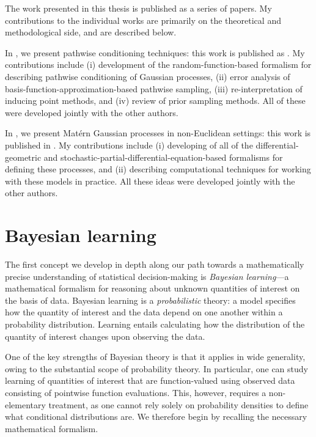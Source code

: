\documentclass[11pt]{book}
\begin{document}
The work presented in this thesis is published as a series of papers.
My contributions to the individual works are primarily on the theoretical and methodological side, and are described below.

In , we present pathwise conditioning techniques: this work is published as \textcite{wilson20,wilson21}.
My contributions include (i) development of the random-function-based formalism for describing pathwise conditioning of Gaussian processes, (ii) error analysis of basis-function-approximation-based pathwise sampling, (iii) re-interpretation of inducing point methods, and (iv) review of prior sampling methods.
All of these were developed jointly with the other authors. 

In , we present Matérn Gaussian processes in non-Euclidean settings: this work is published in \textcite{borovitskiy20,borovitskiy21,jacquier21,hutchinson21}.
My contributions include (i) developing of all of the differential-geometric and stochastic-partial-differential-equation-based formalisms for defining these processes, and (ii) describing computational techniques for working with these models in practice.
All these ideas were developed jointly with the other authors.


\section{Bayesian learning}

The first concept we develop in depth along our path towards a mathematically precise understanding of statistical decision-making is \emph{Bayesian learning}---a mathematical formalism for reasoning about unknown quantities of interest on the basis of data.
Bayesian learning is a \emph{probabilistic} theory: a model specifies how the quantity of interest and the data depend on one another within a probability distribution.
Learning entails calculating how the distribution of the quantity of interest changes upon observing the data.

One of the key strengths of Bayesian theory is that it applies in wide generality, owing to the substantial scope of probability theory. 
In particular, one can study learning of quantities of interest that are function-valued using observed data consisting of pointwise function evaluations.
This, however, requires a non-elementary treatment, as one cannot rely solely on probability densities to define what conditional distributions are.
We therefore begin by recalling the necessary mathematical formalism.
\end{document}
